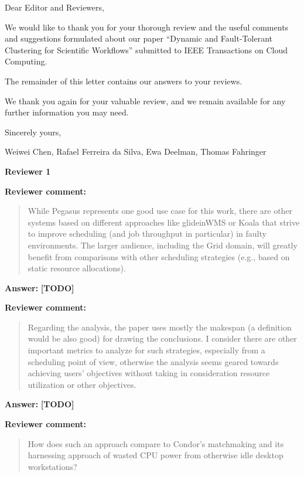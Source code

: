 \documentclass{letter}
\date{Feb 15, 2015}
\newenvironment{review}%
{\textbf{Reviewer comment:}\begin{quote}}%
{\end{quote}}%
\newcommand{\todo}[1]{%
      \color{red}\textbf{[TODO]} #1\color{black}}
\newcommand{\answer}[1]{%
      \textbf{Answer:} #1}
\newcommand{\revised}[1]{\emph{#1}\color{black}}
\begin{document}
\begin{letter}{}

\opening{Dear Editor and Reviewers,}

We would like to thank you for your thorough review and the useful
comments and suggestions formulated about our paper ``Dynamic and Fault-Tolerant Clustering for Scientific Workflows'' submitted to
IEEE Transactions on Cloud Computing.

The remainder of this letter contains our answers to your reviews. 

We thank you again for your valuable review, and we remain available for any further information you may need.

\vspace{0.5cm}

Sincerely yours,

\vspace{1cm}

Weiwei Chen, Rafael Ferreira da Silva, Ewa Deelman, Thomas Fahringer

\newpage

%
%
\textbf{Reviewer 1}

\begin{review}
While Pegasus represents one good use case for this work, there are other systems based on different approaches like glideinWMS or Koala that strive to improve scheduling (and job throughput in particular) in faulty environments. The larger audience, including the Grid domain, will greatly benefit from comparisons with other scheduling strategies (e.g., based on static resource allocations). 
\end{review}

\answer{\todo{}}

\revised{}



\begin{review}
Regarding the analysis, the paper uses mostly the makespan (a definition would be also good) for drawing the conclusions. I consider there are other important metrics to analyze for such strategies, especially from a scheduling point of view, otherwise the analysis seems geared towards achieving users' objectives without taking in consideration resource utilization or other objectives.
\end{review}

\answer{\todo{}}



\begin{review}
How does such an approach compare to Condor's matchmaking and its harnessing approach of wasted CPU power from otherwise idle desktop workstations?
\end{review}


\end{letter}
\end{document}
